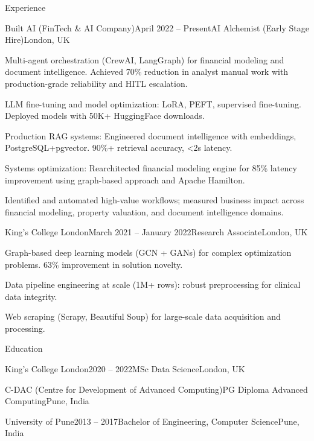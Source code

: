 \documentclass{resume}
\begin{document}

\begin{rSection}{Experience}

\begin{rSubsection}{Built AI (FinTech \& AI Company)}{April 2022 -- Present}{AI Alchemist (Early Stage Hire)}{London, UK}
\item Multi-agent orchestration (CrewAI, LangGraph) for financial modeling and document intelligence. Achieved 70\% reduction in analyst manual work with production-grade reliability and HITL escalation.
\item LLM fine-tuning and model optimization: LoRA, PEFT, supervised fine-tuning. Deployed models with 50K+ HuggingFace downloads.
\item Production RAG systems: Engineered document intelligence with embeddings, PostgreSQL+pgvector. 90\%+ retrieval accuracy, <2s latency.
\item Systems optimization: Rearchitected financial modeling engine for 85\% latency improvement using graph-based approach and Apache Hamilton.
\item Identified and automated high-value workflows; measured business impact across financial modeling, property valuation, and document intelligence domains.
\end{rSubsection}

\begin{rSubsection}{King's College London}{March 2021 -- January 2022}{Research Associate}{London, UK}
\item Graph-based deep learning models (GCN + GANs) for complex optimization problems. 63\% improvement in solution novelty.
\item Data pipeline engineering at scale (1M+ rows): robust preprocessing for clinical data integrity.
\item Web scraping (Scrapy, Beautiful Soup) for large-scale data acquisition and processing.
\end{rSubsection}

\end{rSection}


\begin{rSection}{Education}

\begin{rSubsection}{King's College London}{2020 -- 2022}{MSc Data Science}{London, UK}
\end{rSubsection}

\begin{rSubsection}{C-DAC (Centre for Development of Advanced Computing)}{}{PG Diploma Advanced Computing}{Pune, India}
\end{rSubsection}

\begin{rSubsection}{University of Pune}{2013 -- 2017}{Bachelor of Engineering, Computer Science}{Pune, India}
\end{rSubsection}

\end{rSection}
\end{document}
